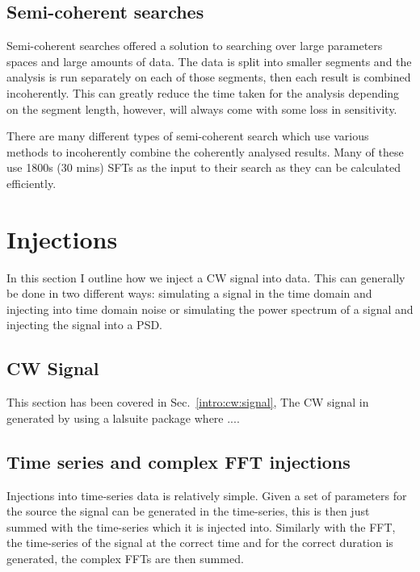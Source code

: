 \subsection{\label{intro:search:semicoherent}Semi-coherent searches}

Semi-coherent searches offered a solution to searching over large parameters spaces and large amounts of data. 
The data is split into smaller segments and the analysis is run separately on each of those segments, then each result is combined incoherently. 
This can greatly reduce the time taken for the analysis depending on the segment length, however, will always come with some loss in sensitivity. 

There are many different types of semi-coherent search which use various methods to incoherently combine the coherently analysed results. Many of these use 1800s (30 mins) \acp{SFT} as the input to their search as they can be calculated efficiently. 



\section{Injections}
In this section I outline how we inject a \ac{CW} signal into data. This can generally be done in two different ways: simulating a signal in the time domain and injecting into time domain noise or simulating the power spectrum of a signal and injecting the signal into a \ac{PSD}.
\subsection{CW Signal}
This section has been covered in Sec.~\ref{intro:cw:signal}, The CW signal in generated by using a lalsuite package where ....

\subsection{Time series and complex \ac{FFT} injections}
Injections into time-series data is relatively simple. Given a set of parameters for the source the signal can be generated in the time-series, this is then just summed with the time-series which it is injected into. Similarly with the \ac{FFT}, the time-series of the signal at the correct time and for the correct duration is generated, the complex \acp{FFT} are then summed.


